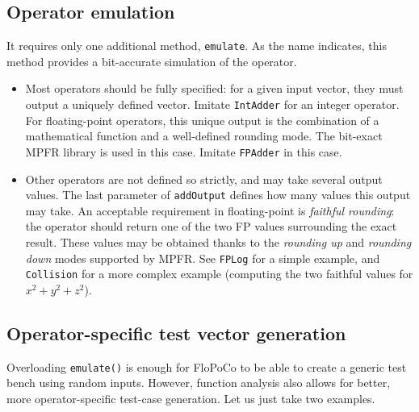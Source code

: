 \documentclass{article}
\begin{document}
\subsection{Operator emulation}


It requires only one additional method, \texttt{emulate}. As the name
indicates, this method provides a bit-accurate simulation of the operator. 
\begin{itemize}
\item Most operators should be fully specified: for a given input
  vector, they must output a uniquely defined vector. Imitate
  \texttt{IntAdder} for an integer operator. For floating-point
  operators, this unique output is the combination of a mathematical
  function and a well-defined rounding mode. The bit-exact MPFR
  library is used in this case. Imitate \texttt{FPAdder} in this case.

\item Other operators are not defined so strictly, and may take
  several output values. The last parameter of \texttt{addOutput}
  defines how many values this output may take. An acceptable
  requirement in floating-point is \emph{faithful rounding}: the
  operator should return one of the two FP values surrounding the
  exact result. These values may be obtained thanks to the
  \emph{rounding up} and \emph{rounding down} modes supported by
  MPFR. See \texttt{FPLog} for a simple example, and
  \texttt{Collision} for a more complex example (computing the two
  faithful values for $x^2+y^2+z^2$).
\end{itemize}

\subsection{Operator-specific test  vector generation}
Overloading \texttt{\small emulate()} is enough for FloPoCo to be able
to create a generic test bench using random inputs. However, function
analysis also allows for better, more operator-specific test-case
generation. Let us just take two examples.
\end{document}
